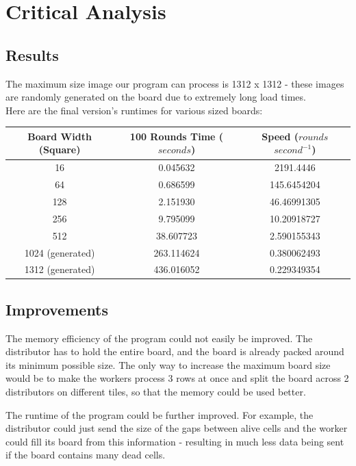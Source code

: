 \documentclass[]{article}
\begin{document}
\section {Critical Analysis}

\subsection{Results}
The maximum size image our program can process is 1312 x 1312 - these images are randomly generated on the board due to extremely long load times.\\

Here are the final version's runtimes for various sized boards:\\

\begin{tabular}{|c|c|c|}
	\hline 
	Board  Width (Square) & 100 Rounds Time ($seconds$) & Speed ($rounds$ $second^{-1}$) \\ 
	\hline 
	16 & 0.045632 & 2191.4446 \\ 
	\hline 
	64 & 0.686599 & 145.6454204 \\ 
	\hline 
	128 & 2.151930 & 46.46991305 \\ 
	\hline 
	256 & 9.795099 & 10.20918727 \\ 
	\hline 
	512 & 38.607723 & 2.590155343 \\ 
	\hline 
	1024 (generated) & 263.114624 & 0.380062493 \\ 
	\hline 
	1312 (generated) & 436.016052 & 0.229349354 \\ 
	\hline              
\end{tabular}

\subsection{Improvements}
The memory efficiency of the program could not easily be improved. The distributor has to hold the entire board, and the board is already packed around its minimum possible size. The only way to increase the maximum board size would be to make the workers process 3 rows at once and split the board across 2 distributors on different tiles, so that the memory could be used better.

The runtime of the program could be further improved. For example, the distributor could just send the size of the gaps between alive cells and the worker could fill its board from this information - resulting in much less data being sent if the board contains many dead cells.
\end{document}
